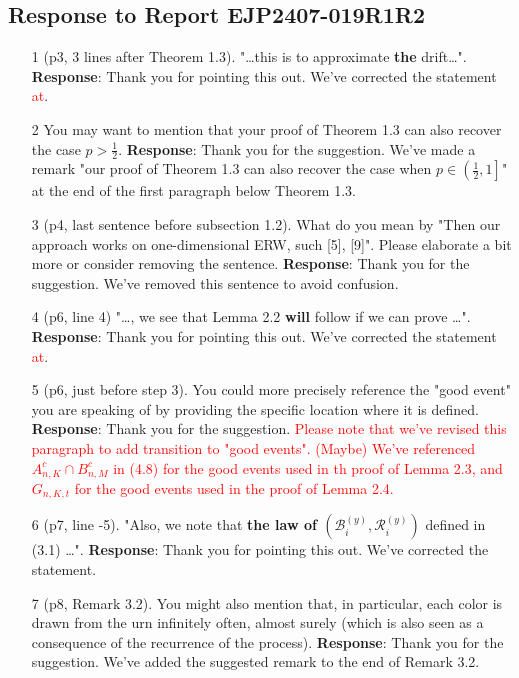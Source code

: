 \documentclass[11pt,a4paper]{article}
\numberwithin{equation}{section}
\def\TBF#1{\textcolor{red}{#1}} %
\begin{document}
	\subsection*{Response to Report EJP2407-019R1R2}
	\begin{itemize}
		\item[1] (p3, 3 lines after Theorem 1.3). "\dots this is to approximate \textbf{the} drift\dots".
		\subitem \textbf{Response}:  Thank you for pointing this out.  We've corrected the statement \TBF{at}.
		
		
		\item[2] You may want to mention that your proof of Theorem 1.3 can also recover the case $p > \frac{1}{2}$.
		\subitem \textbf{Response}:  Thank you for the suggestion. We've made a remark "our proof of Theorem 1.3 can also recover the case when $p \in \left(\frac{1}{2}, 1\right] $" at the end of the first paragraph below Theorem 1.3.
		
		
		\item[3] (p4, last sentence before subsection 1.2). What do you mean by "Then our approach works on one-dimensional ERW, such [5], [9]". Please elaborate a bit more or consider removing the sentence.
		\subitem \textbf{Response}: Thank you for the suggestion. We've removed this sentence to avoid confusion. 
		
		
		\item[4] (p6, line 4) "\dots , we see that Lemma 2.2 \textbf{will} follow if we can prove \dots".
		\subitem \textbf{Response}:  Thank you for pointing this out.  We've corrected the statement \TBF{at}.
		
		
		\item[5] (p6, just before step 3). You could more precisely reference the "good event" you are	speaking of by providing the specific location where it is defined.
		\subitem \textbf{Response}: Thank you for the suggestion. \TBF{Please note that we've revised this paragraph to add transition to "good events". (Maybe) We've referenced $A_{n,K}^c \cap B_{n,M}^c$ in (4.8) for the good events used in th proof of Lemma 2.3, and $G_{n,K,t}$ for the good events used in the proof of Lemma 2.4.}
		
		\item[6](p7, line -5). "Also, we note that \textbf{the law of $\left(\mathcal{B}_i^{(y)}
			,\mathcal{R}_i^{(y)} \right)$} defined in (3.1) \dots ".
		\subitem \textbf{Response}:  Thank you for pointing this out.  We've corrected the statement.
		
		
		\item[7] (p8, Remark 3.2). You might also mention that, in particular, each color is drawn from the
		urn infinitely often, almost surely (which is also seen as a consequence of the recurrence of
		the process).
		\subitem \textbf{Response}:  Thank you for the suggestion. We've added the suggested remark to the end of Remark 3.2.
		

\end{itemize}
\end{document}
